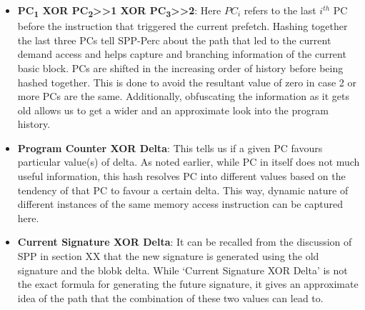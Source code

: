 \documentclass{sig-alternate}
\begin{document}
\begin{itemize}
\item \textbf{PC\textsubscript{1} XOR PC\textsubscript{2}>>1 XOR PC\textsubscript{3}>>2}: Here $PC_i$ refers to the last $i^{th}$ PC before the instruction that triggered the current prefetch. 
Hashing together the last three PCs tell SPP-Perc about the path that led to the current demand access and helps capture and branching information of the current basic block.
PCs are shifted in the increasing order of history before being hashed together.
This is done to avoid the resultant value of zero in case 2 or more PCs are the same. 
Additionally, obfuscating the information as it gets old allows us to get a wider and an approximate look into the program history.

\item \textbf{Program Counter XOR Delta}: This tells us if a given PC favours particular value(s) of delta.
As noted earlier, while PC in itself does not much useful information, this hash resolves PC into different values based on the tendency of that PC to favour a certain delta.
This way, dynamic nature of different instances of the same memory access instruction can be captured here.

\item \textbf{Current Signature XOR Delta}: It can be recalled from the discussion of SPP in section XX that the new signature is generated using the old signature and the blobk delta.
While `Current Signature XOR Delta' is not the exact formula for generating the future signature, it gives an approximate idea of the path that the combination of these two values can lead to.


\end{itemize} 
\end{document}
